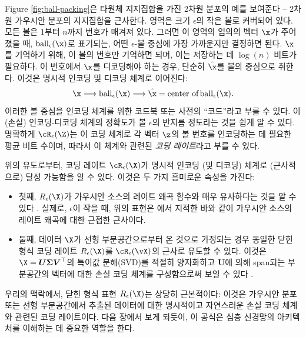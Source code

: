 \documentclass[../../book-main_ko.tex]{subfiles}
\begin{document}
\begin{example}
	Figure \ref{fig:ball-packing}은 타원체 지지집합을 가진 2차원 분포의 예를 보여준다 -- 2차원 가우시안 분포의 지지집합을 근사한다. 영역은 크기 $\epsilon$의 작은 볼로 커버되어 있다. 모든 볼은 $1$부터 $n$까지 번호가 매겨져 있다. 그러면 이 영역의 임의의 벡터 $\x$가 주어졌을 때, $\operatorname{ball}_{\epsilon}(\x)$로 표기되는, 어떤 $\epsilon$-볼 중심에 가장 가까운지만 결정하면 된다. $\x$를 기억하기 위해, 이 볼의 번호만 기억하면 되며, 이는 저장하는 데 $\log(n)$ 비트가 필요하다. 이 번호에서 $\x$를 디코딩해야 하는 경우, 단순히 $\hat \x$를 볼의 중심으로 취한다. 이것은 명시적 인코딩 및 디코딩 체계로 이어진다:
	\begin{equation}
		\x \longrightarrow \operatorname{ball}_{\epsilon}(\x) \longrightarrow \hat \x = \mbox{center of} \operatorname{ball}_{\epsilon}(\x).
	\end{equation}
	이러한 볼 중심을 인코딩 체계를 위한 코드북 또는 사전의 ``코드''라고 부를 수 있다. 이 (손실) 인코딩-디코딩 체계의 정확도가 볼 $\epsilon$의 반지름 정도라는 것을 쉽게 알 수 있다.
	명확하게 $\cR_{\epsilon}(\Z)$는 이 코딩 체계로 각 벡터 $\z$의 볼 번호를 인코딩하는 데 필요한 평균 비트 수이며, 따라서 이 체계와 관련된 {\em 코딩 레이트}라고 부를 수 있다.
\end{example}

위의 유도로부터, 코딩 레이트 $\cR_{\epsilon}(\X)$가 명시적 인코딩 (및 디코딩) 체계로 (근사적으로) 달성 가능함을 알 수 있다. 이것은 두 가지 흥미로운 속성을 가진다:
\begin{itemize}
	\item 첫째, $R_{\epsilon}(\X)$가 가우시안 소스의 레이트 왜곡 함수와 매우 유사하다는 것을 알 수 있다 \cite{Cover-Thomas}. 실제로, $\epsilon$이 작을 때, 위의 표현은 \cite{MaY2007-PAMI}에서 지적한 바와 같이 가우시안 소스의 레이트 왜곡에 대한 근접한 근사이다.
	\item 둘째, 데이터 $\X$가 선형 부분공간으로부터 온 것으로 가정되는 경우 동일한 닫힌 형식 코딩 레이트 $R_{\epsilon}(\X)$를 \(\cR_{\epsilon}(\vX)\)의 근사로 유도할 수 있다. 이것은 $\X = \boldsymbol{U} \boldsymbol{\Sigma}\boldsymbol{V}^\top$의 특이값 분해(SVD)를 적절히 양자화하고 $\boldsymbol{U}$에 의해 span되는 부분공간의 벡터에 대한 손실 코딩 체계를 구성함으로써 보일 수 있다 \cite{MaY2007-PAMI}.
\end{itemize}
우리의 맥락에서, 닫힌 형식 표현 $R_{\epsilon}(\X)$는 상당히 근본적이다: 이것은 가우시안 분포 또는 선형 부분공간에서 추출된 데이터에 대한 명시적이고 자연스러운 손실 코딩 체계와 관련된 코딩 레이트이다. 다음 장에서 보게 되듯이, 이 공식은 심층 신경망의 아키텍처를 이해하는 데 중요한 역할을 한다.
\end{document}
